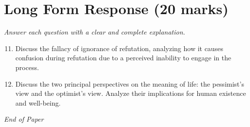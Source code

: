 \documentclass[12pt]{article}
\begin{document}
\section*{Long Form Response (20 marks)}
\textit{Answer each question with a clear and complete explanation.}
\begin{enumerate}[label=\arabic*.]
\setcounter{enumi}{10}
\item Discuss the fallacy of ignorance of refutation, analyzing how it causes confusion during refutation due to a perceived inability to engage in the process.
\item Discuss the two principal perspectives on the meaning of life: the pessimist's view and the optimist's view. Analyze their implications for human existence and well-being.
\end{enumerate}

\vfill
\noindent\textit{End of Paper}
\end{document}
